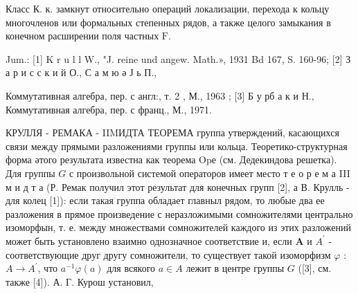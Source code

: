 \documentclass[10pt]{article}
\begin{document}
Класс К. к. замкнут относительно операций локализации, перехода к кольцу многочленов или формальных степенных рядов, а также целого замыкания в конечном расширении поля частных $\mathrm{F}$.



Jum.: [1] K r u l l W., "J. reine und angew. Math.», 1931 Bd 167, S. 160-96; [2] З а р и с с к и й О., С а м ю ә Ј ь П.,

Коммутативная алгебра, пер. с англ:, т. 2 , М., 1963 ; [3] Б у рб а к и Н., Коммутативная алгебра, пер. с франц., М., 1971.



КРУЛЛЯ - РЕМАКА - IIMИДТА ТЕОРЕМА группа утверждений, касающихся связи между прямыми разложениями группы или кольца. Теоретико-структурная форма әтого результата известна как теорема Opе (см. Дедекиндова решетка). Для группы $G$ с произвольной системой операторов имеет место т е о р е м а III м и д т а (Р. Ремак получил этот результат для конечных групп [2], а В. Крулль - для колец [1]): если такая группа обладает главныл рядом, то любые два ее разложения в прямое произведение с неразложимыми сомножителями центрально изоморфын, т. е. между множествами сомножителей каждого из этих разложений может быть установлено взаимно однозначное соответствие и, если $\boldsymbol{A}$ и $A^{\prime}$ - соответствующие друг другу сомножители, то существует такой изоморфизм $\varphi$ : $A \rightarrow A^{\prime}$, что $a^{-1} \varphi(a)$ для всякого $a \in A$ лежит в центре группы $G$ ([3], см. также [4]). А. Г. Курош установил,
\end{document}
